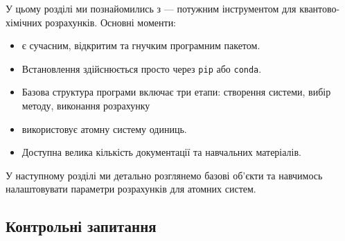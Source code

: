 У цьому розділі ми познайомились з \PySCF{} --- потужним інструментом для квантово-хімічних розрахунків. Основні моменти:

\begin{itemize}
    \item \PySCF{} є сучасним, відкритим та гнучким програмним пакетом.
    \item Встановлення здійснюється просто через \texttt{pip} або \texttt{conda}.
    \item Базова структура програми включає три етапи: створення системи, вибір методу, виконання розрахунку
    \item \PySCF{} використовує атомну систему одиниць.
    \item Доступна велика кількість документації та навчальних матеріалів.
\end{itemize}

У наступному розділі ми детально розглянемо базові об'єкти \PySCF{} та навчимось налаштовувати параметри розрахунків для атомних систем.


\subsection*{Контрольні запитання}

